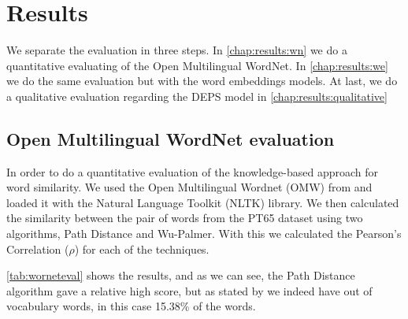 \section{Results}\label{chap:results}


We separate the evaluation in three steps. In \autoref{chap:results:wn} we do a quantitative evaluating of the Open Multilingual WordNet. In \autoref{chap:results:we} we do the same evaluation but with the word embeddings models. At last, we do a qualitative evaluation regarding the DEPS model in \autoref{chap:results:qualitative}



\subsection{Open Multilingual WordNet evaluation}\label{chap:results:wn}

In order to do a quantitative evaluation of the knowledge-based approach for word similarity. We used the Open Multilingual Wordnet (OMW) from  and loaded it with the Natural Language Toolkit (NLTK) library. We then calculated the similarity between the pair of words from the PT65 dataset using two algorithms, Path Distance and Wu-Palmer. With this we calculated the Pearson’s Correlation ($\rho$) for each of the techniques.

\autoref{tab:worneteval} shows the results, and as we can see, the Path Distance algorithm gave a relative high score, but as stated by  we indeed have out of vocabulary words, in this case 15.38\% of the words.


